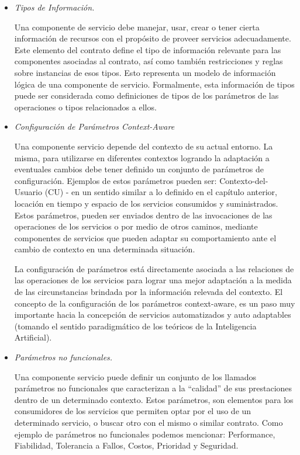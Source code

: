 {\begin{itemize}
\item \textit{Tipos de Información.}

Una componente de servicio debe manejar, usar, crear o tener
cierta información de recursos con el propósito de proveer servicios
adecuadamente.
Este elemento del contrato define el tipo de información relevante para las
componentes
asociadas al contrato, así como también restricciones y reglas sobre instancias
de esos
tipos. Esto representa un modelo de información lógica de una componente de
servicio.
Formalmente, esta información de tipos puede ser considerada como definiciones
de
tipos de los parámetros de las operaciones o tipos relacionados a ellos.


\item \textit{Configuración de Parámetros Context-Aware}

Una componente servicio depende del contexto de su actual entorno. La misma,
para utilizarse en diferentes contextos logrando la adaptación a eventuales
cambios debe tener definido un conjunto de parámetros de configuración. Ejemplos
de estos parámetros pueden ser: Contexto-del-Usuario (CU) - en un sentido
similar a lo definido en el capítulo
anterior, locación en tiempo y espacio de los servicios consumidos y
suministrados. Estos parámetros, pueden ser enviados dentro de las invocaciones
de las operaciones de los servicios o por medio de otros caminos, mediante
componentes de servicios que pueden adaptar su comportamiento ante el cambio de
contexto en una determinada situación.


La configuración de parámetros está directamente asociada a las relaciones de
las operaciones de los servicios para lograr una mejor adaptación a la medida de
las circunstancias brindada por la información relevada del contexto. El
concepto de la configuración de los parámetros context-aware, es un paso muy
importante hacia la concepción de servicios automatizados y auto adaptables
(tomando el sentido paradigmático de los teóricos de la Inteligencia
Artificial).


\item \textit{Parámetros no funcionales.} 

Una componente servicio puede definir un conjunto de los llamados parámetros no
funcionales que caracterizan a la “calidad” de sus prestaciones dentro de un
determinado contexto. Estos parámetros, son elementos para los consumidores de
los servicios que permiten optar por el uso de un determinado servicio, o buscar
otro con el mismo o similar contrato. Como ejemplo de parámetros no funcionales
podemos mencionar: Performance, Fiabilidad, Tolerancia a Fallos, Costos,
Prioridad y Seguridad.


\end{itemize}}
